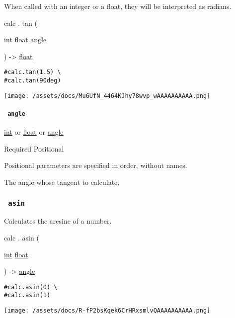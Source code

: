When called with an integer or a float, they will be interpreted as
radians.

calc { . } { tan } (

{ \href{/docs/reference/foundations/int/}{int}
\href{/docs/reference/foundations/float/}{float}
\href{/docs/reference/layout/angle/}{angle} }

) -\textgreater{} \href{/docs/reference/foundations/float/}{float}

\begin{verbatim}
#calc.tan(1.5) \
#calc.tan(90deg)
\end{verbatim}

\texttt{[image: /assets/docs/Mu6UfN\_4464KJhy78wvp\_wAAAAAAAAAA.png]}

\paragraph{\texorpdfstring{\texttt{\ angle\ }}{ angle }}\label{functions-tan-angle}

\href{/docs/reference/foundations/int/}{int} {or}
\href{/docs/reference/foundations/float/}{float} {or}
\href{/docs/reference/layout/angle/}{angle}

{Required} {{ Positional }}

\label{functions-tan-angle-positional-tooltip}
Positional parameters are specified in order, without names.

The angle whose tangent to calculate.

\subsubsection{\texorpdfstring{\texttt{\ asin\ }}{ asin }}\label{functions-asin}

Calculates the arcsine of a number.

calc { . } { asin } (

{ \href{/docs/reference/foundations/int/}{int}
\href{/docs/reference/foundations/float/}{float} }

) -\textgreater{} \href{/docs/reference/layout/angle/}{angle}

\begin{verbatim}
#calc.asin(0) \
#calc.asin(1)
\end{verbatim}

\texttt{[image: /assets/docs/R-fP2bsKqek6CrHRxsmlvQAAAAAAAAAA.png]}

